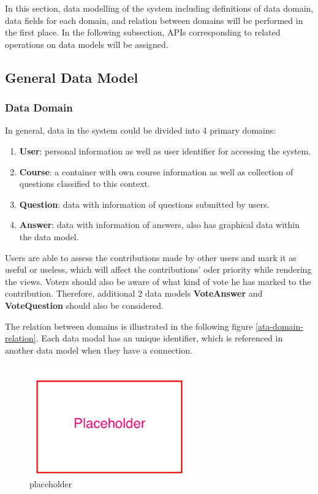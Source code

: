 In this section, data modelling of the system including definitions of data domain, data fields for each domain, and relation between domains will be performed in the first place. In the following subsection, APIs corresponding to related operations on data models will be assigned.

\subsection{General Data Model}


\subsubsection{ Data Domain }
In general, data in the system could be divided into 4 primary domains:

\begin{enumerate}
\item
\textbf{User}: personal information as well as user identifier for accessing the system.
\item
\textbf{Course}: a container with own course information as well as collection of questions classified to this context.
\item
\textbf{Question}:  data with information of questions submitted by users.
\item
\textbf{Answer}: data with information of answers, also has graphical data within the data model.

\end{enumerate}

Users are able to assess the contributions made by other users and mark it as useful or useless, which will affect the contributions' oder priority while rendering the views. Voters should also be aware of what kind of vote he has marked to the contribution. Therefore, additional 2 data models \textbf{VoteAnswer} and \textbf{VoteQuestion} should also be considered. 

The relation between domains is illustrated in the following figure \ref{ata-domain-relation}. Each data modal has an unique identifier, which is referenced in another data model when they have a connection. 

\begin{figure}[!htbp]
  \centering
    \includegraphics[width=0.6\textwidth]{Figures/placeholder.png}
  \caption{placeholder}
  \label{fig:data-domain-relation}
\end{figure}


